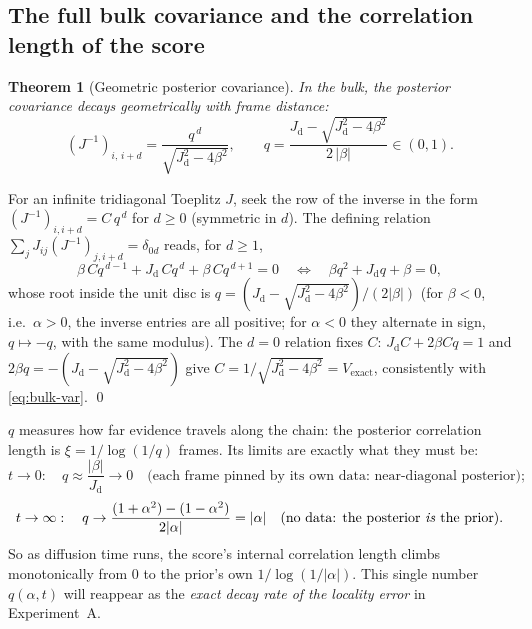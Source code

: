 \documentclass[11pt]{article}
\newtheorem{theorem}[proposition]{Theorem}
\theoremstyle{definition}
\newcommand{\Jd}{J_{\mathrm d}}
\begin{document}
\subsection{The full bulk covariance and the correlation length of the score}

\begin{theorem}[Geometric posterior covariance]\label{thm:bulk-cov}
In the bulk, the posterior covariance decays geometrically with frame
distance:
\begin{equation}\label{eq:bulk-cov}
  \boxed{\ (J^{-1})_{i,\,i+d}=\frac{q^{\,d}}{\sqrt{\Jd^2-4\beta^2}},\qquad
  q=\frac{\Jd-\sqrt{\Jd^2-4\beta^2}}{2\,|\beta|}\in(0,1).\ }
\end{equation}
\end{theorem}

\begin{derivation}
For an infinite tridiagonal Toeplitz $J$, seek the row of the inverse in the
form $(J^{-1})_{i,i+d}=C\,q^{\,d}$ for $d\ge0$ (symmetric in $d$). The
defining relation $\sum_j J_{ij}(J^{-1})_{j,i+d}=\delta_{0d}$ reads, for
$d\ge1$,
\[
  \beta\,Cq^{\,d-1}+\Jd\,Cq^{\,d}+\beta\,Cq^{\,d+1}=0
  \quad\Longleftrightarrow\quad
  \beta q^2+\Jd q+\beta=0 ,
\]
whose root inside the unit disc is $q=(\Jd-\sqrt{\Jd^2-4\beta^2})/(2|\beta|)$
(for $\beta<0$, i.e.\ $\alpha>0$, the inverse entries are all positive; for
$\alpha<0$ they alternate in sign, $q\mapsto-q$, with the same modulus). The
$d=0$ relation fixes
$C$: $\Jd C+2\beta Cq=1$ and $2\beta q=-(\Jd-\sqrt{\Jd^2-4\beta^2})$ give
$C=1/\sqrt{\Jd^2-4\beta^2}=V_{\mathrm{exact}}$, consistently with
\eqref{eq:bulk-var}. \qed
\end{derivation}

\begin{intuition}
$q$ measures how far evidence travels along the chain: the posterior
correlation length is $\xi=1/\log(1/q)$ frames. Its limits are exactly what
they must be:
\[
  t\to0:\quad q\approx\frac{|\beta|}{\Jd}\to0
  \quad\text{(each frame pinned by its own data: near-diagonal posterior)};
\]
\[
  t\to\infty:\quad
  q\to\frac{(1+\alpha^2)-(1-\alpha^2)}{2|\alpha|}=|\alpha|
  \quad\text{(no data: the posterior \emph{is} the prior)}.
\]
So as diffusion time runs, the score's internal correlation length climbs
monotonically from $0$ to the prior's own $1/\log(1/|\alpha|)$. This single
number $q(\alpha,t)$ will reappear as the \emph{exact decay rate of the
locality error} in Experiment~A.
\end{intuition}
\end{document}
